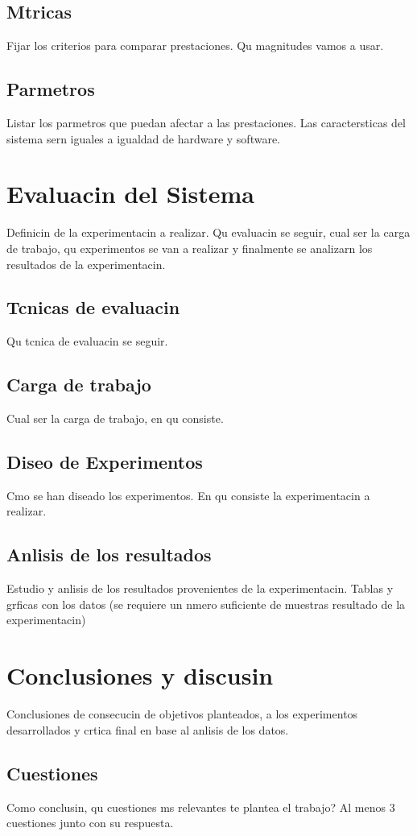 \documentclass[11pt,twoside,a4paper]{book}
\renewcommand{\baselinestretch}{1.2}
\begin{document}
\section{Mtricas}
Fijar los criterios para comparar prestaciones. Qu magnitudes vamos a usar.


\section{Parmetros}
Listar los parmetros que puedan afectar a las prestaciones. Las caractersticas del sistema sern iguales a igualdad de hardware y software.


\chapter{Evaluacin del Sistema}
Definicin de la experimentacin a realizar. Qu evaluacin se seguir, cual ser la carga de trabajo, qu experimentos se van a realizar y finalmente se analizarn los resultados de la experimentacin.

\section{Tcnicas de evaluacin}
Qu tcnica de evaluacin se seguir.

\section{Carga de trabajo}
Cual ser la carga de trabajo, en qu consiste.

\section{Diseo de Experimentos}
Cmo se han diseado los experimentos. En qu consiste la experimentacin a realizar.

\section{Anlisis de los resultados}
Estudio y anlisis de los resultados provenientes de la experimentacin. Tablas y grficas con los datos (se requiere un nmero suficiente de muestras resultado de la experimentacin)

\chapter{Conclusiones y discusin}

Conclusiones de consecucin de objetivos planteados, a los experimentos
desarrollados y crtica final en base al anlisis de los datos.

\section{Cuestiones}
Como conclusin, qu cuestiones ms relevantes te plantea el trabajo? Al menos 3 cuestiones junto con su respuesta.


\appendix

\renewcommand{\baselinestretch}{1.2}



\cite{KM2000}
\end{document}
